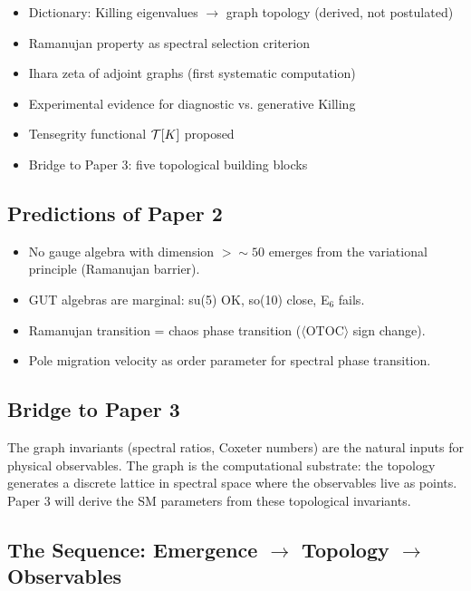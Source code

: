 \begin{itemize}
    \item Dictionary: Killing eigenvalues $\to$ graph topology (derived, not postulated)
    \item Ramanujan property as spectral selection criterion
    \item Ihara zeta of adjoint graphs (first systematic computation)
    \item Experimental evidence for diagnostic vs. generative Killing
    \item Tensegrity functional $\mathcal{T}[K]$ proposed
    \item Bridge to Paper 3: five topological building blocks
\end{itemize}

\subsection{Predictions of Paper 2}\label{sec:predictions}

\begin{itemize}
    \item No gauge algebra with dimension $> \sim\!50$ emerges from the variational principle (Ramanujan barrier).
    \item GUT algebras are marginal: su(5) OK, so(10) close, E$_6$ fails.
    \item Ramanujan transition = chaos phase transition ($\langle\mathrm{OTOC}\rangle$ sign change).
    \item Pole migration velocity as order parameter for spectral phase transition.
\end{itemize}

\subsection{Bridge to Paper 3}\label{sec:bridge_p3}

The graph invariants (spectral ratios, Coxeter numbers) are the natural inputs for physical observables. The graph is the computational substrate: the topology generates a discrete lattice in spectral space where the observables live as points. Paper 3 will derive the SM parameters from these topological invariants.

\subsection{The Sequence: Emergence $\to$ Topology $\to$ Observables}\label{sec:sequence}

